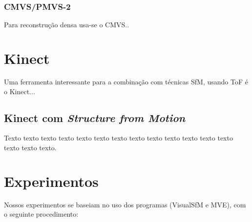 \documentclass[table, usenames, svgnames, xcolor=dvipsnames]{beamer}
\begin{document}
\begin{frame} 
\frametitle{\textbf{CMVS/PMVS-2}}
	\begin{center}
Para reconstrução densa usa-se o CMVS..
	\end{center}
\end{frame}

\section{Kinect}

\begin{frame}
	\begin{center}
    	Uma ferramenta interessante para a combinação com técnicas SfM, usando ToF é o Kinect...
	\end{center}
\end{frame}

\subsection{Kinect com \emph{Structure from Motion}}

\begin{frame} 
	\begin{center}
		Texto texto texto texto texto texto texto texto texto texto texto texto texto
		texto texto texto.
	\end{center}
\end{frame}

\section{Experimentos}

\begin{frame}
	\begin{center}
		Nossos experimentos se baseiam no uso dos programas (VisualSfM e MVE), com o seguinte procedimento:
	\end{center}
\end{frame}

\begin{frame}
	\begin{center}
	\end{center}
\end{frame}
\end{document}
